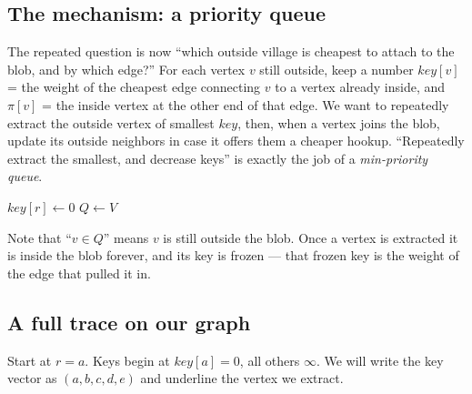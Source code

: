 \subsection{The mechanism: a priority queue}

The repeated question is now ``which outside village is cheapest to attach to the
blob, and by which edge?'' For each vertex $v$ still outside, keep a number
$key[v]$ = the weight of the cheapest edge connecting $v$ to a vertex already
inside, and $\pi[v]$ = the inside vertex at the other end of that edge. We want to
repeatedly extract the outside vertex of smallest $key$, then, when a vertex joins
the blob, update its outside neighbors in case it offers them a cheaper hookup.
``Repeatedly extract the smallest, and decrease keys'' is exactly the job of a
\emph{min-priority queue}.

\begin{algorithm}[H]
\caption{\textsc{MST-Prim}$(G, w, r)$}
$key[r] \gets 0$\;
$Q \gets V$
\end{algorithm}

Note that ``$v \in Q$'' means $v$ is still outside the blob.
Once a vertex is extracted it is inside the blob forever, and its key is frozen ---
that frozen key is the weight of the edge that pulled it in.

\subsection{A full trace on our graph}

Start at $r = a$. Keys begin at $key[a]=0$, all others $\infty$. We will write the
key vector as $(a,b,c,d,e)$ and underline the vertex we extract.

